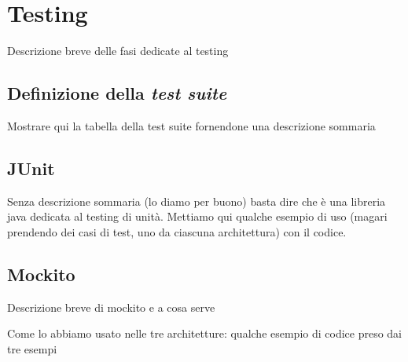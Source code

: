 \section{Testing}

Descrizione breve delle fasi dedicate al testing

\subsection{Definizione della \emph{test suite}}

Mostrare qui la tabella della test suite fornendone una descrizione sommaria

\subsection{JUnit}

Senza descrizione sommaria (lo diamo per buono) basta dire che è una libreria java dedicata al testing di unità. Mettiamo qui qualche esempio di uso (magari prendendo dei casi di test, uno da ciascuna architettura) con il codice.

\subsection{Mockito}

Descrizione breve di mockito e a cosa serve

Come lo abbiamo usato nelle tre architetture: qualche esempio di codice preso dai tre esempi